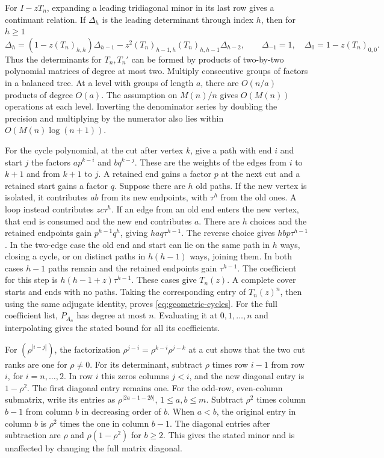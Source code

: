 \documentclass[11pt,reqno]{amsart}
\theoremstyle{remark}
\numberwithin{equation}{section}
\begin{document}
For \(I-zT_n\), expanding a leading tridiagonal minor in its last row gives
a continuant relation. If \(\Delta_h\) is the leading determinant through
index \(h\), then for \(h\ge1\)
\[
 \Delta_h=(1-z(T_n)_{h,h})\Delta_{h-1}
            -z^2(T_n)_{h-1,h}(T_n)_{h,h-1}\Delta_{h-2},
 \qquad \Delta_{-1}=1,\quad \Delta_0=1-z(T_n)_{0,0}.
\]
Thus the determinants for \(T_n,T_n'\) can be formed by products of
two-by-two polynomial matrices of degree at most two. Multiply
consecutive groups of factors in a balanced tree. At a level with groups
of length \(a\), there are \(O(n/a)\) products of degree \(O(a)\). The
assumption on \(M(n)/n\) gives \(O(M(n))\) operations at each level.
Inverting the denominator series by doubling the precision and
multiplying by the numerator also lies within \(O(M(n)\log(n+1))\).

For the cycle polynomial, at the cut after vertex \(k\), give a path with
end \(i\) and start \(j\) the factors \(ap^{k-i}\) and \(bq^{k-j}\).
These are the weights of the edges from \(i\) to \(k+1\) and from \(k+1\)
to \(j\). A retained end gains a factor \(p\) at the next cut and a
retained start gains a factor \(q\). Suppose there are \(h\) old paths.
If the new vertex is isolated, it contributes \(ab\) from its new
endpoints, with \(\tau^h\) from the old ones. A loop instead contributes
\(zc\tau^h\). If an edge from an old end enters the new vertex, that end
is consumed and the new end contributes \(a\). There are \(h\) choices
and the retained endpoints gain \(p^{h-1}q^h\), giving \(haq\tau^{h-1}\).
The reverse choice gives \(hbp\tau^{h-1}\). In the two-edge case the old
end and start can lie on the same path in \(h\) ways, closing a cycle, or
on distinct paths in \(h(h-1)\) ways, joining them. In both cases \(h-1\)
paths remain and the retained endpoints gain \(\tau^{h-1}\). The
coefficient for this step is \(h(h-1+z)\tau^{h-1}\). These cases give
\(T_n(z)\). A complete cover starts and ends with no paths. Taking the
corresponding entry of \(T_n(z)^n\), then using the same adjugate identity,
proves \eqref{eq:geometric-cycles}.
For the full coefficient list, \(P_{A_n}\) has degree at most \(n\).
Evaluating it at \(0,1,\ldots,n\) and interpolating gives the stated
bound for all its coefficients.

For \((\rho^{|i-j|})\), the factorization
\(\rho^{j-i}=\rho^{k-i}\rho^{j-k}\) at a cut shows that the two cut ranks
are one for \(\rho\ne0\). For its determinant, subtract \(\rho\) times
row \(i-1\) from row \(i\), for \(i=n,\ldots,2\). In row \(i\) this zeros
columns \(j<i\), and the new diagonal entry is \(1-\rho^2\). The first
diagonal entry remains one. For the odd-row, even-column submatrix, write
its entries as \(\rho^{|2a-1-2b|}\), \(1\le a,b\le m\). Subtract
\(\rho^2\) times column \(b-1\) from column \(b\) in decreasing order of
\(b\). When \(a<b\), the original entry in column \(b\) is \(\rho^2\)
times the one in column \(b-1\). The diagonal entries after subtraction
are \(\rho\) and \(\rho(1-\rho^2)\) for \(b\ge2\). This gives the stated
minor and is unaffected by changing the full matrix diagonal.
\end{document}
